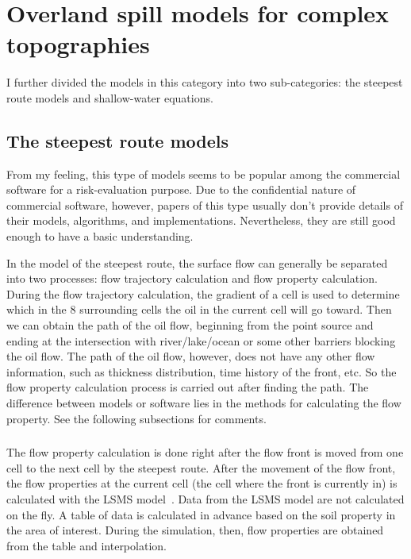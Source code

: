\documentclass[letterpaper]{article}
\begin{document}
\section{Overland spill models for complex topographies}

I further divided the models in this category into two sub-categories: 
the steepest route models and shallow-water equations.

\subsection{The steepest route models}

From my feeling, this type of models seems to be popular among the commercial
software for a risk-evaluation purpose. 
Due to the confidential nature of commercial software, however, papers of this 
type usually don't provide details of their models, algorithms, and 
implementations. 
Nevertheless, they are still good enough to have a basic understanding.

In the model of the steepest route, the surface flow can generally be separated 
into two processes: flow trajectory calculation and flow property calculation. 
During the flow trajectory calculation, the gradient of a cell is used to 
determine which in the 8 surrounding cells the oil in the current cell will go
toward.
Then we can obtain the path of the oil flow, beginning from the point 
source and ending at the intersection with river/lake/ocean or some other 
barriers blocking the oil flow. 
The path of the oil flow, however, does not have any other flow information, 
such as thickness distribution, time history of the front, etc.
So the flow property calculation process is carried out after finding the path.
The difference between models or software lies in the methods for calculating 
the flow property. See the following subsections for comments.

\subsubsection{\textcite{Ronnie2004}}

The flow property calculation is done right after the flow front is moved from 
one cell to the next cell by the steepest route. 
After the movement of the flow front, the flow properties at the current cell 
(the cell where the front is currently in) is calculated with the LSMS 
model\ \cite{Linden1998}. 
Data from the LSMS model are not calculated on the fly. 
A table of data is calculated in advance based on the soil property in the 
area of interest. 
During the simulation, then, flow properties are obtained from the table and 
interpolation.
\end{document}
